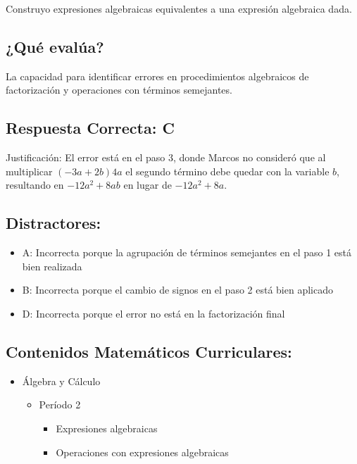 \documentclass[
]{article}
\providecommand{\tightlist}{%
  \setlength{\itemsep}{0pt}\setlength{\parskip}{0pt}}
\begin{document}
Construyo expresiones algebraicas equivalentes a una expresión
algebraica dada.

\subsection{¿Qué evalúa?}\label{quuxe9-evaluxfaa-5}

La capacidad para identificar errores en procedimientos algebraicos de
factorización y operaciones con términos semejantes.

\subsection{Respuesta Correcta: C}\label{respuesta-correcta-c}

Justificación: El error está en el paso 3, donde Marcos no consideró que
al multiplicar \((−3a + 2b)4a\) el segundo término debe quedar con la
variable \(b\), resultando en \(-12a^2 + 8ab\) en lugar de
\(-12a^2 + 8a\).

\subsection{Distractores:}\label{distractores-3}

\begin{itemize}
\tightlist
\item
  A: Incorrecta porque la agrupación de términos semejantes en el paso 1
  está bien realizada
\item
  B: Incorrecta porque el cambio de signos en el paso 2 está bien
  aplicado
\item
  D: Incorrecta porque el error no está en la factorización final
\end{itemize}

\subsection{Contenidos Matemáticos
Curriculares:}\label{contenidos-matemuxe1ticos-curriculares-6}

\begin{itemize}
\tightlist
\item
  Álgebra y Cálculo

  \begin{itemize}
  \tightlist
  \item
    Período 2

    \begin{itemize}
    \tightlist
    \item
      Expresiones algebraicas
    \item
      Operaciones con expresiones algebraicas
    \end{itemize}
  \end{itemize}
\end{itemize}
\end{document}
